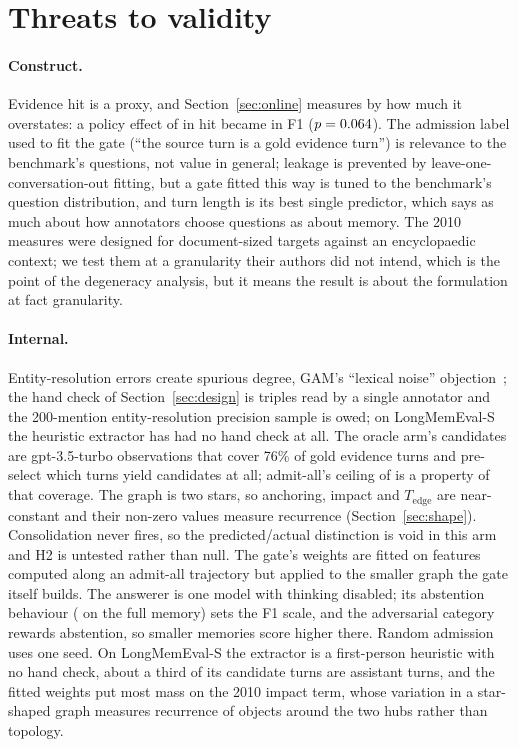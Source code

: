 \documentclass{ceurart}
\newcommand{\Tedge}{T_{\mathrm{edge}}}
\begin{document}
\section{Threats to validity}
\label{sec:threats}

\paragraph{Construct.} Evidence hit is a proxy, and Section~\ref{sec:online} measures by how much it overstates: a policy effect of \permRandomMean{} in hit became \dFoneStructRandomTwo{} in F1 ($p=0.064$). The admission label used to fit the gate (``the source turn is a gold evidence turn'') is relevance to the benchmark's questions, not value in general; leakage is prevented by leave-one-conversation-out fitting, but a gate fitted this way is tuned to the benchmark's question distribution, and turn length is its best single predictor, which says as much about how annotators choose questions as about memory. The 2010 measures were designed for document-sized targets against an encyclopaedic context; we test them at a granularity their authors did not intend, which is the point of the degeneracy analysis, but it means the result is about the formulation at fact granularity.

\paragraph{Internal.} Entity-resolution errors create spurious degree, GAM's ``lexical noise'' objection~\cite{gam2026}; the hand check of Section~\ref{sec:design} is \extHandCheckN{} triples read by a single annotator and the 200-mention entity-resolution precision sample is owed; on LongMemEval-S the heuristic extractor has had no hand check at all. The oracle arm's candidates are gpt-3.5-turbo observations that cover 76\% of gold evidence turns and pre-select which turns yield candidates at all; admit-all's ceiling of \hitLcAdmitAll{} is a property of that coverage. The graph is two stars, so anchoring, impact and $\Tedge$ are near-constant and their non-zero values measure recurrence (Section~\ref{sec:shape}). Consolidation never fires, so the predicted/actual distinction is void in this arm and H2 is untested rather than null. The gate's weights are fitted on features computed along an admit-all trajectory but applied to the smaller graph the gate itself builds. The answerer is one model with thinking disabled; its abstention behaviour (\abstTwoAdmitAll{} on the full memory) sets the F1 scale, and the adversarial category rewards abstention, so smaller memories score higher there. Random admission uses one seed. On LongMemEval-S the extractor is a first-person heuristic with no hand check, about a third of its candidate turns are assistant turns, and the fitted weights put most mass on the 2010 impact term, whose variation in a star-shaped graph measures recurrence of objects around the two hubs rather than topology.
\end{document}
